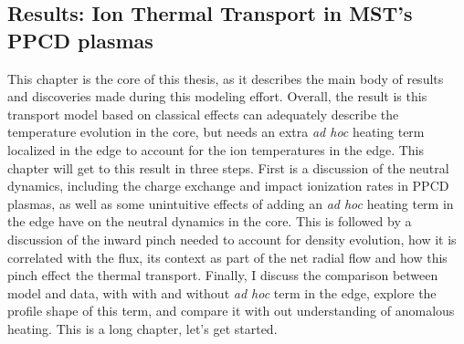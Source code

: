 \begin{refsection}


\chapter{Results: Ion Thermal Transport in MST's PPCD plasmas}\label{ch:results}



This chapter is the core of this thesis, as it describes the main body of results and discoveries made during this modeling effort. Overall, the result is this transport model based on classical effects can adequately describe the temperature evolution in the core, but needs an extra \textit{ad hoc} heating term localized in the edge to account for the ion temperatures in the edge. This chapter will get to this result in three steps. First is a discussion of the neutral dynamics, including the charge exchange and impact ionization rates in PPCD plasmas, as well as some unintuitive effects of adding an \textit{ad hoc} heating term in the edge have on the neutral dynamics in the core. This is followed by a discussion of the inward pinch needed to account for density evolution, how it is correlated with the \ecb flux, its context as part of the net radial flow and how this pinch effect the thermal transport. Finally, I discuss the comparison between model and data, with with and without \textit{ad hoc} term in the edge, explore the profile shape of this term, and compare it with out understanding of anomalous heating. This is a long chapter, let's get started.








\printbibliography
\end{refsection}